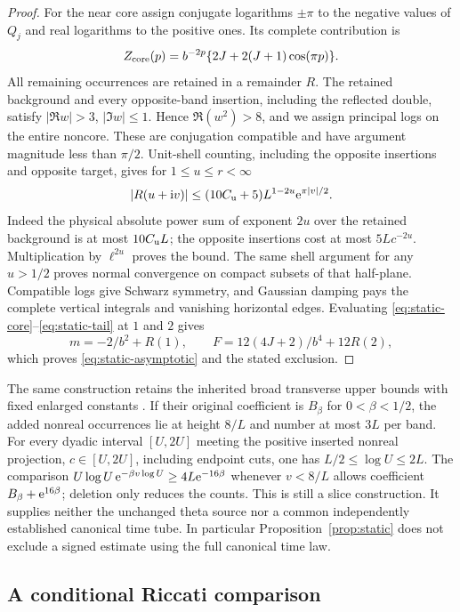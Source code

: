 \begin{proof}
For the near core assign conjugate logarithms $\pm\pi$ to the negative
values of $Q_j$ and real logarithms to the positive ones. Its complete
contribution is
\begin{equation}
 Z_{\rm core}(p)=b^{-2p}\{2J+2(J+1)\cos(\pi p)\}.
 \label{eq:static-core}
\end{equation}
All remaining occurrences are retained in a remainder $R$. The retained
background and every opposite-band insertion, including the reflected
double, satisfy $|\Re w|>3$, $|\Im w|\le1$. Hence
$\Re(w^2)>8$, and we assign principal logs on the entire noncore.
These are conjugation compatible and have argument magnitude less than
$\pi/2$. Unit-shell counting, including the opposite insertions and
opposite target, gives
for $1\le u\le r<\infty$
\begin{equation}
 |R(u+\mathrm i v)|\le (10C_{\mathrm u}+5)L^{1-2u}\mathrm e^{\pi|v|/2}.
 \label{eq:static-tail}
\end{equation}
Indeed the physical absolute power sum of exponent $2u$ over the
retained background is at most $10C_{\mathrm u} L$; the opposite insertions
cost at most $5Lc^{-2u}$. Multiplication by $\ell^{2u}$ proves the
bound. The same shell argument for any $u>1/2$ proves normal
convergence on compact subsets of that half-plane. Compatible logs
give Schwarz symmetry, and Gaussian damping pays the complete vertical
integrals and vanishing horizontal edges. Evaluating
\eqref{eq:static-core}--\eqref{eq:static-tail} at $1$ and $2$ gives
\[
 m=-2/b^2+R(1),\qquad
 F=12(4J+2)/b^4+12R(2),
\]
which proves \eqref{eq:static-asymptotic} and the stated exclusion.
\end{proof}

The same construction retains the inherited broad transverse upper
bounds with fixed enlarged constants \cite[Section 3]{BakerGR05}.
If their original coefficient is $B_\beta$ for $0<\beta<1/2$, the
added nonreal occurrences lie
at height $8/L$ and number at most $3L$ per band. For every dyadic
interval $[U,2U]$ meeting the positive inserted nonreal projection,
$c\in[U,2U]$, including endpoint cuts, one has
$L/2\le\log U\le2L$. The comparison
$U\log U\,\mathrm e^{-\beta v\log U}\ge4L\mathrm e^{-16\beta}$ whenever
$v<8/L$ allows coefficient $B_\beta+\mathrm e^{16\beta}$; deletion only
reduces the counts. This is still a slice construction. It supplies
neither the unchanged theta source nor a common independently established
canonical time tube. In particular Proposition~\ref{prop:static} does
not exclude a signed estimate using the full canonical time law.

\subsection{A conditional Riccati comparison}

